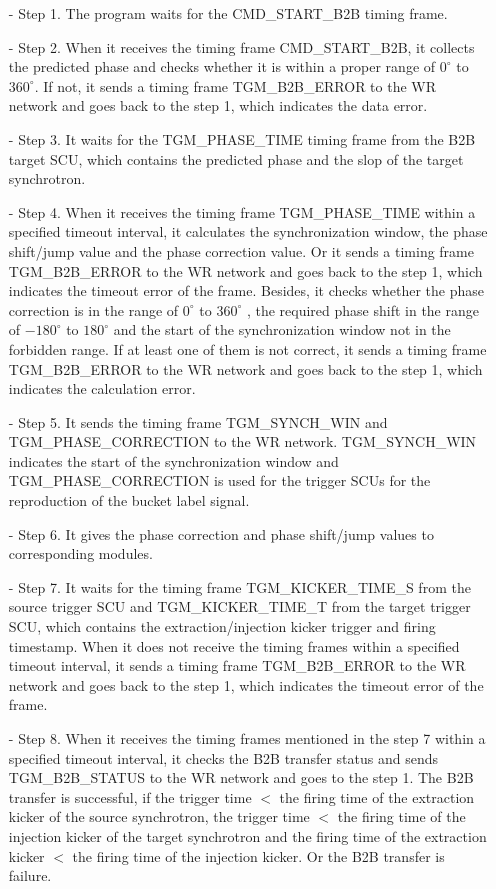 \begin{itemize}
 	\begin{itemize}
		\item[-]Step 1. The program waits for the CMD\_START\_B2B timing frame.
 		\item[-]Step 2. When it receives the timing frame CMD\_START\_B2B, it collects the predicted phase and checks whether it is within a proper range of $0^\circ$ to $360^\circ$. If not, it sends a timing frame TGM\_B2B\_ERROR to the WR network and goes back to the step 1, which indicates the data error.
		\item[-]Step 3. It waits for the TGM\_PHASE\_TIME timing frame from the B2B target SCU, which contains the predicted phase and the slop of the target synchrotron.
		\item[-]Step 4. When it receives the timing frame TGM\_PHASE\_TIME within a specified timeout interval, it calculates the synchronization window, the phase shift/jump value and the phase correction value. Or it sends a timing frame TGM\_B2B\_ERROR to the WR network and goes back to the step 1, which indicates the timeout error of the frame. Besides, it checks whether the phase correction is in the range of $0^\circ$ to $360^\circ$ , the required phase shift in the range of $-180^\circ$ to $180^\circ$ and the start of the synchronization window not in the forbidden range. If at least one of them is not correct, it sends a timing frame TGM\_B2B\_ERROR to the WR network and goes back to the step 1, which indicates the calculation error. 
		\item[-]Step 5. It sends the timing frame TGM\_SYNCH\_WIN and TGM\_PHASE\_CORRECTION to the WR network. TGM\_SYNCH\_WIN indicates the start of the synchronization window and TGM\_PHASE\_CORRECTION is used for the trigger SCUs for the reproduction of the bucket label signal.
		\item[-]Step 6. It gives the phase correction and phase shift/jump values to corresponding modules.
		\item[-]Step 7. It waits for the timing frame TGM\_KICKER\_TIME\_S from the source trigger SCU and TGM\_KICKER\_TIME\_T from the target trigger SCU, which contains the extraction/injection kicker trigger and firing timestamp. When it does not receive the timing frames within a specified timeout interval, it sends a timing frame TGM\_B2B\_ERROR to the WR network and goes back to the step 1, which indicates the timeout error of the frame.
		\item[-]Step 8. When it receives the timing frames mentioned  in the step 7 within a specified timeout interval, it checks the B2B transfer status and sends TGM\_B2B\_STATUS to the WR network and goes to the step 1. The B2B transfer is successful, if the trigger time $<$ the firing time of the extraction kicker of the source synchrotron, the trigger time $<$ the firing time of the injection kicker of the target synchrotron and the firing time of the extraction kicker $<$ the firing time of the injection kicker. Or the B2B transfer is failure. 


\end{itemize}
\end{itemize}
